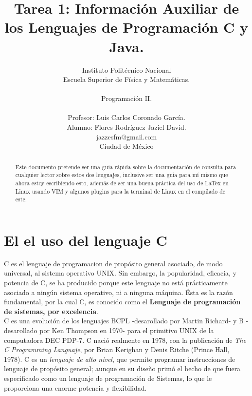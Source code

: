 %
%



\title{Tarea 1: Información Auxiliar de los Lenguajes de Programación C y Java.}
\author{Instituto Politécnico Nacional\\
	Escuela Superior de Física y Matemáticas. \\
	\\
	Programación II. \\ \\ 
	Profesor: Luis Carlos Coronado García.\\
	Alumno: Flores Rodríguez Jaziel David. \\
  \small jazzesfm@gmail.com\\
  \small Ciudad de México
  \date{}
}


\maketitle

\begin{abstract}
Este documento pretende ser una guia rápida sobre la documentación de consulta para cualquier lector sobre estos dos lenguajes, inclusive ser una guia para mí mismo que ahora estoy escribiendo esto, además de ser una buena práctica del uso de LaTex en Linux usando VIM y algunos plugins para la terminal de Linux en el compilado de este. 
\end{abstract}

\section{El el uso del lenguaje C} 
C es el lenguaje de programacion de propósito general asociado, de modo universal, al sistema operativo UNIX. Sin embargo, la popularidad, eficacia, y potencia de C, se ha producido porque este lenguaje no está prácticamente asociado a ningún sistema operativo, ni a ninguna máquina. Ésta es la razón fundamental, por la cual C, es conocido como el \textbf{Lenguaje de programación de sistemas, por excelencia}.\\
C es una evolución de los lenguajes BCPL -desarollado por Martin Richard- y B -desarollado por Ken Thompson en 1970- para el primitivo UNIX de la computadora DEC PDP-7. C nació realmente en 1978, con la publicación de \textit{The C Programming Languaje}, por Brian Kerighan y Denis Ritche (Prince Hall, 1978). C es un \textit{lenguaje de alto nivel}, que permite programar instrucciones de lenguaje de propósito general; aunque en su diseño primó el hecho de que fuera especificado como un lenguaje de programación de Sistemas, lo que le proporciona una enorme potencia y flexibilidad. 

